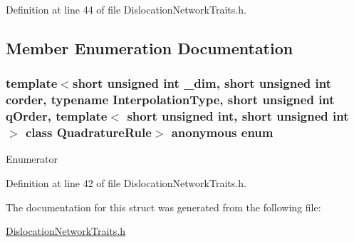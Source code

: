 Definition at line 44 of file Dislocation\+Network\+Traits.\+h.



\subsection{Member Enumeration Documentation}
\hypertarget{structmodel_1_1_dislocation_network_traits_base_a4fc6af2f3f7c090b878e886427b3cdee}{}\subsubsection[{anonymous enum}]{\setlength{\rightskip}{0pt plus 5cm}template$<$short unsigned int \+\_\+dim, short unsigned int corder, typename Interpolation\+Type, short unsigned int q\+Order, template$<$ short unsigned int, short unsigned int $>$ class Quadrature\+Rule$>$ anonymous enum}\label{structmodel_1_1_dislocation_network_traits_base_a4fc6af2f3f7c090b878e886427b3cdee}
\begin{Desc}
\item[Enumerator]\par
\begin{description}
\item[{\em 
\hypertarget{structmodel_1_1_dislocation_network_traits_base_a4fc6af2f3f7c090b878e886427b3cdeea70440340d2141c79ba221e3464826940}{}dim\label{structmodel_1_1_dislocation_network_traits_base_a4fc6af2f3f7c090b878e886427b3cdeea70440340d2141c79ba221e3464826940}
}]\end{description}
\end{Desc}


Definition at line 42 of file Dislocation\+Network\+Traits.\+h.



The documentation for this struct was generated from the following file\+:\begin{DoxyCompactItemize}
\item 
\hyperlink{_dislocation_network_traits_8h}{Dislocation\+Network\+Traits.\+h}\end{DoxyCompactItemize}
